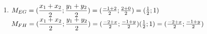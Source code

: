 \begin{eocsolutions}{}
{\begin{enumerate}[itemsep=5pt, label=\textbf{\arabic*}. ]
\begin{enumerate}[itemsep=5pt, label=\textbf{(\alph*)} ]
\begin{enumerate}[noitemsep, label=\textbf{\roman*}. ]
\item
$d_{QR} = \sqrt{(x_1-x_2)^2+(y_1-y_2)^2}\\
    = \sqrt{(2-5)^2+(3-3)^2}\\
    = \sqrt{(-3)^2+0}\\
    = \sqrt{9}\\
    = 3$
\end{enumerate}

\item Trapezium.%
\end{enumerate}

\item  %
$M_{EG} = (\dfrac{x_1+x_2}{2};\dfrac{y_1+y_2}{2})\\[4pt]
    = (\frac{-1+2}{2};\frac{2+0}{2})\\
    = (\frac{1}{2};1)$\\

$M_{FH} = (\dfrac{x_1+x_2}{2};\dfrac{y_1+y_2}{2})\\[4pt]
	= (\frac{-2+x}{2};\frac{-1+y}{2})\\
 (\frac{1}{2};1) = (\frac{-2+x}{2};\frac{-1+y}{2})$\\


\end{enumerate}}
\end{eocsolutions}
